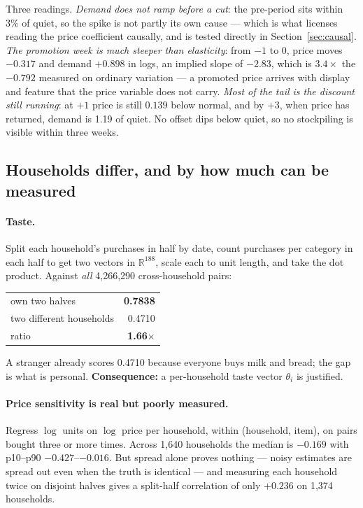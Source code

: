 \documentclass[11pt]{article}
\begin{document}
Three readings. \emph{Demand does not ramp before a cut}: the pre-period sits within 3\%
of quiet, so the spike is not partly its own cause --- which is what licenses reading the
price coefficient causally, and is tested directly in Section~\ref{sec:causal}.
\emph{The promotion week is much steeper than elasticity}: from $-1$ to $0$, price moves
$-0.317$ and demand $+0.898$ in logs, an implied slope of $-2.83$, which is $3.4\times$
the $-0.792$ measured on ordinary variation --- a promoted price arrives with display and
feature that the price variable does not carry. \emph{Most of the tail is the discount
still running}: at $+1$ price is still $0.139$ below normal, and by $+3$, when price has
returned, demand is 1.19 of quiet. No offset dips below quiet, so no stockpiling is
visible within three weeks.

\subsection{Households differ, and by how much can be measured}
\label{sec:hh}

\paragraph{Taste.} Split each household's purchases in half by date, count purchases per
category in each half to get two vectors in $\mathbb{R}^{188}$, scale each to unit
length, and take the dot product. Against \emph{all} 4,266,290 cross-household pairs:

\begin{center}
\begin{tabular}{lr}
\toprule
own two halves & \textbf{0.7838} \\
two different households & 0.4710 \\
ratio & \textbf{1.66$\times$} \\
\bottomrule
\end{tabular}
\end{center}

A stranger already scores 0.4710 because everyone buys milk and bread; the gap is
what is personal. \textbf{Consequence:} a per-household taste vector $\theta_i$ is
justified.

\paragraph{Price sensitivity is real but poorly measured.} Regress $\log$ units on
$\log$ price per household, within (household, item), on pairs bought three or more
times. Across 1,640 households the median is $-0.169$ with p10--p90
$-0.427$--$-0.016$. But spread alone proves nothing --- noisy estimates are spread
out even when the truth is identical --- and measuring each household twice on disjoint
halves gives a split-half correlation of only $+0.236$ on 1,374 households.
\end{document}
